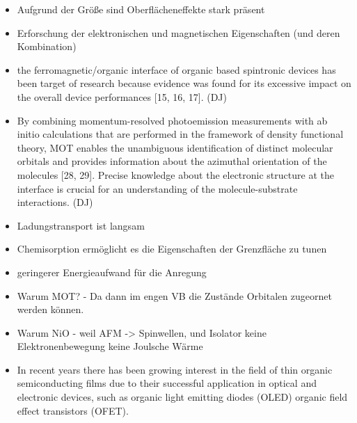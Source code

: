 \begin{itemize}
    \item Aufgrund der Größe sind Oberflächeneffekte stark präsent
    \item Erforschung der elektronischen und magnetischen Eigenschaften (und deren Kombination)
    \item the ferromagnetic/organic interface of organic based spintronic devices has been target of research because evidence was found for its excessive impact on the overall device performances [15, 16, 17]. (DJ)
    \item By combining momentum-resolved photoemission measurements with ab initio calculations that are performed in the framework of density functional theory, MOT enables the unambiguous identification of distinct molecular orbitals and provides information about the azimuthal orientation of the molecules [28, 29]. Precise knowledge about the electronic structure at the interface is crucial for an understanding of the molecule-substrate interactions. (DJ)
    \item Ladungstransport ist langsam
    \item Chemisorption ermöglicht es die Eigenschaften der Grenzfläche zu tunen
    \item geringerer Energieaufwand für die Anregung
    \item Warum MOT? - Da dann im engen VB die Zustände Orbitalen zugeornet werden können.
    \item Warum NiO - weil AFM -> Spinwellen, und Isolator keine Elektronenbewegung keine Joulsche Wärme
    \item In recent years there has been growing interest in the field of thin organic semiconducting films due to their successful application in optical and electronic devices, such as organic light emitting diodes (OLED) organic field effect transistors (OFET). \cite{Uni-Tübingen}
\end{itemize}